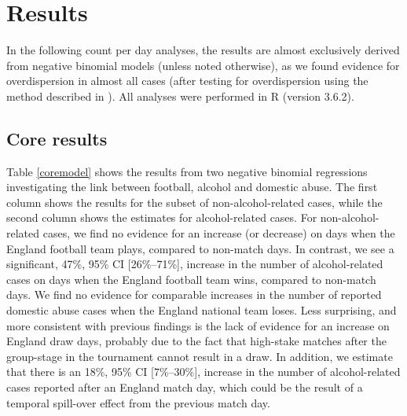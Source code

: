 \documentclass[12pt, a4paper]{article}
\begin{document}
\newpage

\section{Results}

In the following count per day analyses, the results are almost exclusively derived from negative binomial models (unless noted otherwise), as we found evidence for overdispersion in almost all cases (after testing for overdispersion using the method described in ). All analyses were performed in R (version 3.6.2).


\subsection{Core results} 

Table \ref{coremodel} shows the results from two negative binomial regressions investigating the link between football, alcohol and domestic abuse. The first column shows the results for the subset of non-alcohol-related cases, while the second column shows the estimates for alcohol-related cases. For non-alcohol-related cases, we find no evidence for an increase (or decrease) on days when the England football team plays, compared to non-match days. In contrast, we see a significant, 47\%, 95\% CI [26\%--71\%], increase in the number of alcohol-related cases on days when the England football team wins, compared to non-match days. We find no evidence for comparable increases in the number of reported domestic abuse cases when the England national team loses. Less surprising, and more consistent with previous findings is the lack of evidence for an increase on England draw days, probably due to the fact that high-stake matches after the group-stage in the tournament cannot result in a draw. In addition, we estimate that there is an 18\%, 95\% CI [7\%--30\%], increase in the number of alcohol-related cases reported after an England match day, which could be the result of a temporal spill-over effect from the previous match day. 
\end{document}
